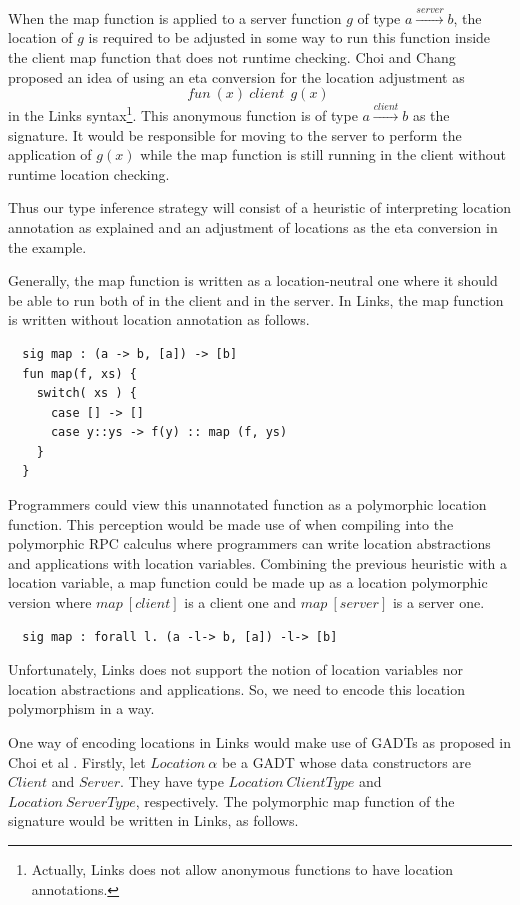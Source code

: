 \documentclass[a4paper]{article}
\theoremstyle{plain}
\theoremstyle{definition}
\newcommand{\funL}[1]{\xrightarrow{#1}}
\begin{document}
When the map function is applied to a server function $g$ of type
$a\funL{server}b$, the location of $g$ is required to be adjusted in
some way to run this function inside the client map function that does
not runtime checking.
%
Choi and Chang \cite{choijfp2019} proposed an idea of using an eta
conversion for the location adjustment as
%
\[
fun \ (x) \ client \ { \ g(x) \ }
\]
%
in the Links syntax\footnote{Actually, Links does not allow anonymous
  functions to have location annotations.}.
%
This anonymous function is of type $a\funL{client} b$ as the
signature.
%
It would be responsible for moving to the server to perform the
application of $g(x)$ while the map function is still running in the
client without runtime location checking.

Thus our type inference strategy will consist of a heuristic of
interpreting location annotation as explained and an adjustment of
locations as the eta conversion in the example.


Generally, the map function is written as a location-neutral one where
it should be able to run both of in the client and in the server.
%
In Links, the map function is written without location annotation as
follows.

\begin{lstlisting}
  sig map : (a -> b, [a]) -> [b]
  fun map(f, xs) {
    switch( xs ) {
      case [] -> []
      case y::ys -> f(y) :: map (f, ys)
    }
  }
\end{lstlisting}

%
Programmers could view this unannotated function as a polymorphic
location function.
%
This perception would be made use of when compiling into the
polymorphic RPC calculus where programmers can write location
abstractions and applications with location variables.
%
Combining the previous heuristic with a location variable, a map
function could be made up as a location polymorphic version where $map
\ [client]$ is a client one and $map \ [server]$ is a server one.

\begin{lstlisting}
  sig map : forall l. (a -l-> b, [a]) -l-> [b]
\end{lstlisting}

%
Unfortunately, Links does not support the notion of location variables
nor location abstractions and applications.
%
So, we need to encode this location polymorphism in a way.

%
One way of encoding locations in Links would make use of GADTs as
proposed in Choi et al \cite{CHOI:scp2020}.
%
Firstly, let $Location \ \alpha$ be a GADT whose data constructors are
$Client$ and $Server$.
%
They have type $Location \ ClientType$ and
$Location \ ServerType$, respectively.
%
The polymorphic map function of the signature would be written in
Links, as follows.
\end{document}
